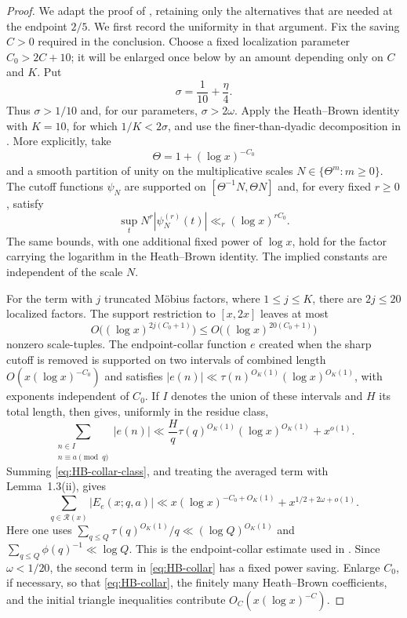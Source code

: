 \documentclass[11pt,reqno]{amsart}
\theoremstyle{definition}
\theoremstyle{remark}
\numberwithin{equation}{section}
\begin{document}
\begin{proof}
We adapt the proof of \cite[Lemma~2.7 and Section~3]
{PolymathDistribution}, retaining only the alternatives that are needed
at the endpoint $2/5$. We first record the uniformity in that argument.
Fix the saving $C>0$ required in the conclusion. Choose a fixed
localization parameter $C_0>2C+10$; it will be enlarged once below by an
amount depending only on $C$ and $K$. Put
\[
 \sigma=\frac1{10}+\frac\eta4.
\]
Thus $\sigma>1/10$ and, for our parameters, $\sigma>2\omega$.
Apply the Heath--Brown identity with $K=10$, for which $1/K<2\sigma$,
and use the finer-than-dyadic decomposition in
\cite[Equations~(3.8)--(3.13)]{PolymathDistribution}. More explicitly,
take
\[
 \Theta=1+(\log x)^{-C_0}
\]
and a smooth partition of unity on the multiplicative scales
$N\in\{\Theta^m:m\ge0\}$. The cutoff functions $\psi_N$ are supported
on $[\Theta^{-1}N,\Theta N]$ and, for every fixed $r\ge0$, satisfy
\begin{equation}\label{eq:HB-derivatives}
 \sup_t N^r|\psi_N^{(r)}(t)|
       \ll_r(\log x)^{rC_0}.
\end{equation}
The same bounds, with one additional fixed power of $\log x$, hold for
the factor carrying the logarithm in the Heath--Brown identity. The
implied constants are independent of the scale $N$.

For the term with $j$ truncated M\"obius factors, where $1\le j\le K$,
there are $2j\le20$ localized factors. The support restriction to
$[x,2x]$ leaves at most
\begin{equation}\label{eq:HB-number}
 O\bigl((\log x)^{2j(C_0+1)}\bigr)
 \le O\bigl((\log x)^{20(C_0+1)}\bigr)
\end{equation}
nonzero scale-tuples. The endpoint-collar function $e$ created when the
sharp cutoff is removed is supported on two intervals of combined
length $O(x(\log x)^{-C_0})$ and satisfies
$|e(n)|\ll\tau(n)^{O_K(1)}(\log x)^{O_K(1)}$, with exponents independent
of $C_0$. If $I$ denotes the union of these intervals and $H$ its total
length, then
\cite[Lemma~1.3(iii)]{PolymathDistribution} gives, uniformly in the
residue class,
\begin{equation}\label{eq:HB-collar-class}
 \sum_{\substack{n\in I\\n\equiv a\pmod q}}|e(n)|
 \ll \frac Hq\tau(q)^{O_K(1)}(\log x)^{O_K(1)}+x^{o(1)}.
\end{equation}
Summing \eqref{eq:HB-collar-class}, and treating the averaged term with
Lemma~1.3(ii), gives
\begin{equation}\label{eq:HB-collar}
 \sum_{q\in\mathcal R(x)}|E_e(x;q,a)|
 \ll x(\log x)^{-C_0+O_K(1)}
      +x^{1/2+2\omega+o(1)}.
\end{equation}
Here one uses
$\sum_{q\le Q}\tau(q)^{O_K(1)}/q\ll(\log Q)^{O_K(1)}$ and
$\sum_{q\le Q}\phi(q)^{-1}\ll\log Q$. This is the endpoint-collar
estimate used in \cite[Equations~(3.10)--(3.13)]{PolymathDistribution}.
Since $\omega<1/20$, the second term in \eqref{eq:HB-collar} has a
fixed power saving. Enlarge $C_0$, if necessary, so that
\eqref{eq:HB-collar}, the finitely many
Heath--Brown coefficients, and the initial triangle inequalities
contribute $O_C(x(\log x)^{-C})$.


\end{proof}
\end{document}

